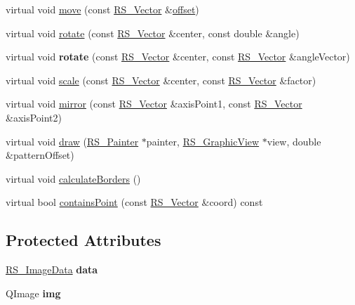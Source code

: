 \begin{DoxyCompactItemize}
\item 
virtual void \hyperlink{classRS__Image_ac4a8cb1fc8da3e0c3ba631d64984f767}{move} (const \hyperlink{classRS__Vector}{R\-S\-\_\-\-Vector} \&\hyperlink{classRS__AtomicEntity_ab708a0d05c11fd7eff646243db60464a}{offset})
\item 
virtual void \hyperlink{classRS__Image_a0c50e24c3fad193dc30ca6b781deba79}{rotate} (const \hyperlink{classRS__Vector}{R\-S\-\_\-\-Vector} \&center, const double \&angle)
\item 
\hypertarget{classRS__Image_ac978b2c1ff414089d164ffc976efd874}{virtual void {\bfseries rotate} (const \hyperlink{classRS__Vector}{R\-S\-\_\-\-Vector} \&center, const \hyperlink{classRS__Vector}{R\-S\-\_\-\-Vector} \&angle\-Vector)}\label{classRS__Image_ac978b2c1ff414089d164ffc976efd874}

\item 
virtual void \hyperlink{classRS__Image_aa83b86816d4269b8911d1c7e997ce865}{scale} (const \hyperlink{classRS__Vector}{R\-S\-\_\-\-Vector} \&center, const \hyperlink{classRS__Vector}{R\-S\-\_\-\-Vector} \&factor)
\item 
virtual void \hyperlink{classRS__Image_a9af39be11c56e60215837fe20b4c5148}{mirror} (const \hyperlink{classRS__Vector}{R\-S\-\_\-\-Vector} \&axis\-Point1, const \hyperlink{classRS__Vector}{R\-S\-\_\-\-Vector} \&axis\-Point2)
\item 
virtual void \hyperlink{classRS__Image_a2905d340f8631af7f5446176f05bb0ec}{draw} (\hyperlink{classRS__Painter}{R\-S\-\_\-\-Painter} $\ast$painter, \hyperlink{classRS__GraphicView}{R\-S\-\_\-\-Graphic\-View} $\ast$view, double \&pattern\-Offset)
\item 
virtual void \hyperlink{classRS__Image_ab2df463d1fda1ee1004a64a1776f02d1}{calculate\-Borders} ()
\item 
virtual bool \hyperlink{classRS__Image_a8cf9454f897ae3eb8948ea846f32f21e}{contains\-Point} (const \hyperlink{classRS__Vector}{R\-S\-\_\-\-Vector} \&coord) const 
\end{DoxyCompactItemize}
\subsection*{Protected Attributes}
\begin{DoxyCompactItemize}
\item 
\hypertarget{classRS__Image_a109fa3686506d6285cf8d475a07b0645}{\hyperlink{classRS__ImageData}{R\-S\-\_\-\-Image\-Data} {\bfseries data}}\label{classRS__Image_a109fa3686506d6285cf8d475a07b0645}

\item 
\hypertarget{classRS__Image_a25e853bac19623ab49b3cdad376c0c12}{Q\-Image {\bfseries img}}\label{classRS__Image_a25e853bac19623ab49b3cdad376c0c12}

\end{DoxyCompactItemize}
